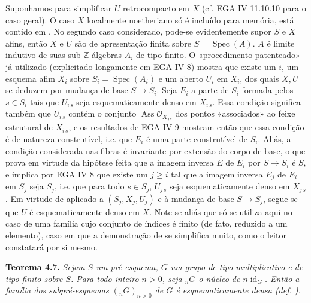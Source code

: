 Suponhamos para simplificar \(U\) retrocompacto em \(X\) (cf.
EGA IV 11.10.10 para o caso geral). O caso \(X\) localmente
noetheriano só é incluído para memória, está contido em
. No segundo caso
considerado, pode-se evidentemente supor \(S\) e \(X\) afins,
então \(X\) e \(U\) são de apresentação finita sobre
\(S=\operatorname{Spec}(A)\). \(A\) é limite indutivo de suas
sub-\(\mathbb Z\)-álgebras \(A_i\) de tipo finito. O
«procedimento patenteado» já utilizado (explicitado longamente em
EGA IV 8) mostra que existe um \(i\), um esquema afim \(X_i\)
sobre \(S_i=\operatorname{Spec}(A_i)\) e um aberto \(U_i\) em
\(X_i\), dos quais \(X,U\) se deduzem por mudança de base
\(S\to S_i\). Seja \(E_i\) a parte de \(S_i\) formada pelos
\(s\in S_i\) tais que \(U_{i\,s}\) seja esquematicamente denso
em \(X_{i\,s}\). Essa condição significa também que \(U_{i\,s}\)
contém o conjunto \(\operatorname{Ass}\mathscr O_{X_{j\,s}}\)
dos pontos «associados» ao feixe estrutural de \(X_{i\,s}\), e
os resultados de EGA IV 9 mostram então que essa condição é de
natureza construtível, i.e. que \(E_i\) é uma parte construtível
de \(S_i\). Aliás, a condição considerada nas fibras é invariante
por extensão do corpo de base, o que prova em virtude da hipótese
feita que a imagem inversa \(E\) de \(E_i\) por \(S\to S_i\)
é \(S\), e implica por EGA IV 8 que existe um \(j\geq i\) tal
que a imagem inversa \(E_j\) de \(E_i\) em \(S_j\) seja \(S_j\),
i.e. que para todo \(s\in S_j\), \(U_{j\,s}\) seja
esquematicamente denso em \(X_{j\,s}\). Em virtude de
 aplicado a
\((S_j,X_j,U_j)\) e à mudança de base \(S\to S_j\), segue-se
que \(U\) é esquematicamente denso em \(X\). Note-se aliás que
só se utiliza aqui  no caso
de uma família cujo conjunto de índices é finito (de fato,
reduzido a um elemento), caso em que a demonstração de
 se simplifica muito, como o
leitor constatará por si mesmo.
\label{fnref:IX-24}

\medskip
\noindent{}\textbf{Teorema 4.7.}
\textit{Sejam \(S\) um pré-esquema, \(G\) um grupo de tipo
multiplicativo e de tipo finito sobre \(S\). Para todo inteiro
\(n>0\), seja \({}_nG\) o núcleo de \(n\operatorname{id}_G\).
Então a família dos subpré-esquemas \(({}_nG)_{n>0}\) de \(G\)
é esquematicamente densa (def.
).}

